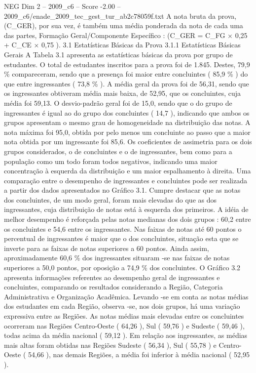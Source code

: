 \begin{textsample}{NEG Dim 2 – 2009\_c6 – Score -2.00 – 2009\_c6/enade\_2009\_tec\_gest\_tur\_ab2c78059f.txt}
A nota bruta da prova, (C\_GER), por sua vez, é também uma média ponderada da nota de cada uma das partes, Formação Geral/Componente Específico : (C\_GER = C\_FG × 0,25 + C\_CE × 0,75 ). 3.1 Estatísticas Básicas da Prova 3.1.1 Estatísticas Básicas Gerais A Tabela 3.1 apresenta as estatísticas básicas da prova por grupo de estudantes.
O total de estudantes inscritos para a prova foi de 1.845.
Destes, 79,9 \% compareceram, sendo que a presença foi maior entre concluintes ( 85,9 \% ) do que entre ingressantes ( 73,8 \% ).
A média geral da prova foi de 56,31, sendo que os ingressantes obtiveram média mais baixa, de 52,95, que os concluintes, cuja média foi 59,13.
O desvio-padrão geral foi de 15,0, sendo que o do grupo de ingressantes é igual ao do grupo dos concluintes ( 14,7 ), indicando que ambos os grupos apresentam o mesmo grau de homogeneidade na distribuição das notas.
A nota máxima foi 95,0, obtida por pelo menos um concluinte ao passo que a maior nota obtida por um ingressante foi 85,6.
Os coeficientes de assimetria para os dois grupos considerados, o de concluintes e o de ingressantes, bem como para a população como um todo foram todos negativos, indicando uma maior concentração à esquerda da distribuição e um maior espalhamento à direita.
Uma comparação entre o desempenho de ingressantes e concluintes pode ser realizada a partir dos dados apresentados no Gráfico 3.1.
Cumpre destacar que as notas dos concluintes, de um modo geral, foram mais elevadas do que as dos ingressantes, cuja distribuição de notas está à esquerda dos primeiros.
A idéia de melhor desempenho é reforçada pelas notas medianas dos dois grupos : 60,2 entre os concluintes e 54,6 entre os ingressantes.
Nas faixas de notas até 60 pontos o percentual de ingressantes é maior que o dos concluintes, situação esta que se inverte para as faixas de notas superiores a 60 pontos.
Ainda assim, aproximadamente 60,6 \% dos ingressantes situaram -se nas faixas de notas superiores a 50,0 pontos, por oposição a 74,9 \% dos concluintes.
O Gráfico 3.2 apresenta informações referentes ao desempenho geral de ingressantes e concluintes, comparando os resultados considerando a Região, Categoria Administrativa e Organização Acadêmica.
Levando -se em conta as notas médias dos estudantes em cada Região, observa -se, nos dois grupos, há uma variação expressiva entre as Regiões.
As notas médias mais elevadas entre os concluintes ocorreram nas Regiões Centro-Oeste ( 64,26 ), Sul ( 59,76 ) e Sudeste ( 59,46 ), todas acima da média nacional ( 59,12 ).
Em relação aos ingressantes, as médias mais altas foram obtidas nas Regiões Sudeste ( 56,34 ), Sul ( 55,78 ) e Centro-Oeste ( 54,66 ), nas demais Regiões, a média foi inferior à média nacional ( 52,95 ).

\end{textsample}
